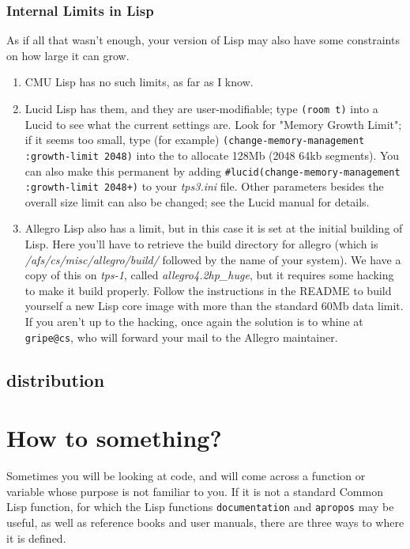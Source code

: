 \subsubsection{Internal Limits in Lisp}
As if all that wasn't enough, your version of Lisp may also have some constraints on how large it can grow.
\begin{enumerate}
\item CMU Lisp has no such limits, as far as I know.

\item Lucid Lisp has them, and they are user-modifiable; type {\tt (room t)} into a Lucid \TPS to see 
what the current settings are. Look for "Memory Growth Limit"; if it seems too small, type
(for example)
{\tt (change-memory-management :growth-limit 2048)} into the \TPS to allocate 128Mb (2048 64kb segments).
You can also make this permanent by adding {\tt \#lucid(change-memory-management :growth-limit 2048+)}
to your {\it tps3.ini} file. Other parameters besides the overall size limit can also be changed; see the
Lucid manual for details.

\item Allegro Lisp also has a limit, but in this case it is set at the initial building of Lisp. Here you'll
have to retrieve the build directory for allegro (which is {\it /afs/cs/misc/allegro/build/} followed by 
the name of your system). We have a copy of this on {\it tps-1}, called {\it allegro4.2hp\_huge}, but it
requires some hacking to make it build properly. Follow the instructions in the README to build yourself
a new Lisp core image with more than the standard 60Mb data limit. If you aren't up to the 
hacking, once again the solution is to whine at {\tt gripe@cs}, who will forward your mail to the 
Allegro maintainer.
\end{enumerate}

\subsection{\TPS distribution}



\section{How to  something?}\label{finding}
Sometimes you will be looking at code, and will come across a function
or variable whose purpose is not familiar to you.  If it is not a standard Common
Lisp function, for which the Lisp functions {\tt documentation} and
{\tt apropos} may be useful, as well as reference books and user manuals,
there are three ways to  where it is defined.

